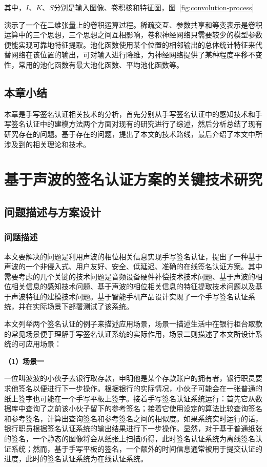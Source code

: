 其中，$I$、$K$、$S$分别是输入图像、卷积核和特征图，图~\ref{fig:convolution-process}

演示了一个在二维张量上的卷积运算过程。稀疏交互、参数共享和等变表示是卷积运算中的三个思想，三个思想之间互相影响，卷积神经网络只需要较少的模型参数便能实现可靠地特征提取。池化函数使用某个位置的相邻输出的总体统计特征来代替网络在该位置的输出，可对输入进行降维，为神经网络提供了某种程度平移不变性，常用的池化函数有最大池化函数、平均池化函数等。


\section{本章小结}
本章是手写签名认证相关技术的分析，首先分别从手写签名认证中的感知技术和手写签名认证中的建模方法两个方面对现有的研究进行了综述，然后分析总结了现有研究存在的问题。基于存在的问题，提出了本文的技术路线，最后介绍了本文中所涉及到的相关理论和技术。

\chapter{基于声波的签名认证方案的关键技术研究}
\section{问题描述与方案设计}
\subsection{问题描述}
本文要解决的问题是利用声波的相位相关信息实现手写签名认证，提出了一种基于声波的一个非侵入式、用户友好、安全、低延迟、准确的在线签名认证方案。其中需要考虑的几个关键的技术问题是音频设备硬件补偿技术技术问题、基于声波的相位相关信息的感知技术问题、基于声波的相位相关信息的特征提取技术问题以及基于声波特征的建模技术问题。基于智能手机产品设计实现了一个手写签名认证系统，并在实际场景下部署测试了该系统。

本文列举两个签名认证的例子来描述应用场景，场景一描述生活中在银行柜台取款的常见场景便于理解手写签名认证系统的实际作用，场景二则描述了本文所设计系统的可应用场景：

\textbf{（1）场景一}

一位叫波波的小伙子去银行取存款，申明他是某个存款账户的拥有者，银行职员要求他签名以便进行下一步操作。根据银行的实际情况，小伙子可能会在一张普通的纸上签字也可能在一个手写平板上签字。接着手写签名认证系统运行：首先它从数据库中查询了之前该小伙子留下的参考签名；接着它使用设定的算法比较查询签名和参考签名，计算出查询签名和参考签名之间的相似度。如果系统实时运行的话，银行职员根据签名认证系统的输出结果进行下一步操作。显然，对于基于普通纸张的签名，一个静态的图像将会从纸张上扫描所得，此时签名认证系统为离线签名认证系统；然而，基于手写平板的签名，一个额外的时间信息通常被用于提交认证的进度，此时的签名认证系统为在线认证系统。

